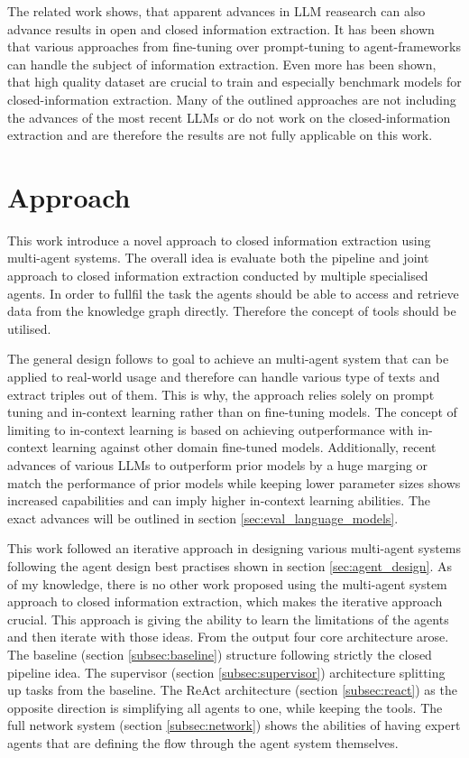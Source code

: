 \documentclass[a4paper,oneside,bibliography=totoc]{scrbook}
\begin{document}
The related work shows, that apparent advances in \ac{LLM} reasearch can also advance results in open and closed information extraction. It has been shown that various approaches from fine-tuning over prompt-tuning to agent-frameworks can handle the subject of information extraction. Even more has been shown, that high quality dataset are crucial to train and especially benchmark models for closed-information extraction. Many of the outlined approaches are not including the advances of the most recent \acp{LLM} or do not work on the closed-information extraction and are therefore the results are not fully applicable on this work.

\chapter{Approach}
\label{ch:approach}

This work introduce a novel approach to closed information extraction using multi-agent systems. The overall idea is evaluate both the pipeline and joint approach to closed information extraction conducted by multiple specialised agents. In order to fullfil the task the agents should be able to access and retrieve data from the knowledge graph directly. Therefore the concept of tools should be utilised.

The general design follows to goal to achieve an multi-agent system that can be applied to real-world usage and therefore can handle various type of texts and extract triples out of them. This is why, the approach relies solely on prompt tuning and in-context learning rather than on fine-tuning models. The concept of limiting to in-context learning is based on \citet{Brown2020} achieving outperformance with in-context learning against other domain fine-tuned models. Additionally, recent advances of various \acp{LLM} to outperform prior models by a huge marging or match the performance of prior models while keeping lower parameter sizes \cite{MetaAI2024,Chiang2024} shows increased capabilities and can imply higher in-context learning abilities. The exact advances will be outlined in section \ref{sec:eval_language_models}.

This work followed an iterative approach in designing various multi-agent systems following the agent design best practises shown in section \ref{sec:agent_design}. As of my knowledge, there is no other work proposed using the multi-agent system approach to closed information extraction, which makes the iterative approach crucial. This approach is giving the ability to learn the limitations of the agents and then iterate with those ideas. From the output four core architecture arose. The baseline (section \ref{subsec:baseline}) structure following strictly the closed pipeline idea. The supervisor (section \ref{subsec:supervisor}) architecture splitting up tasks from the baseline. The ReAct architecture (section \ref{subsec:react}) as the opposite direction is simplifying all agents to one, while keeping the tools. The full network system (section \ref{subsec:network}) shows the abilities of having expert agents that are defining the flow through the agent system themselves.
\end{document}
